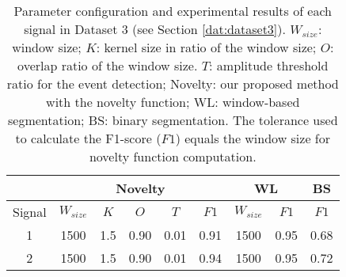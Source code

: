 \begin{table}
    \caption{Parameter configuration and experimental results of each signal in Dataset 3 (see Section \ref{dat:dataset3}). $W_{size}$: window size; $K$: kernel size in ratio of the window size; $O$: overlap ratio of the window size. $T$: amplitude threshold ratio for the event detection; Novelty: our proposed method with the novelty function; WL: window-based segmentation; BS: binary segmentation. The tolerance used to calculate the F1-score ($F1$) equals the window size for novelty function computation.}
    \centering
    \begin{tabular}{ccccccccc}
    \toprule
    & \multicolumn{5}{c}{Novelty} & \multicolumn{2}{c}{WL} & BS\\
    \midrule
    Signal &     $W_{size}$ &     $K$ &     $O$ &   $T$    &     $F1$ & $W_{size}$ & $F1$ & $F1$\\
    \cmidrule(lr){2-6} \cmidrule(lr){7-8} \cmidrule(lr){9-9}
    1 & 1500 & 1.5 & 0.90 & 0.01 & 0.91 & 1500 & 0.95 & 0.68 \\
    2 & 1500 & 1.5 & 0.90 & 0.01 & 0.94 & 1500 & 0.95 & 0.72 \\
    \bottomrule
    \end{tabular}
    \label{tab:params_results_1}
\end{table}


